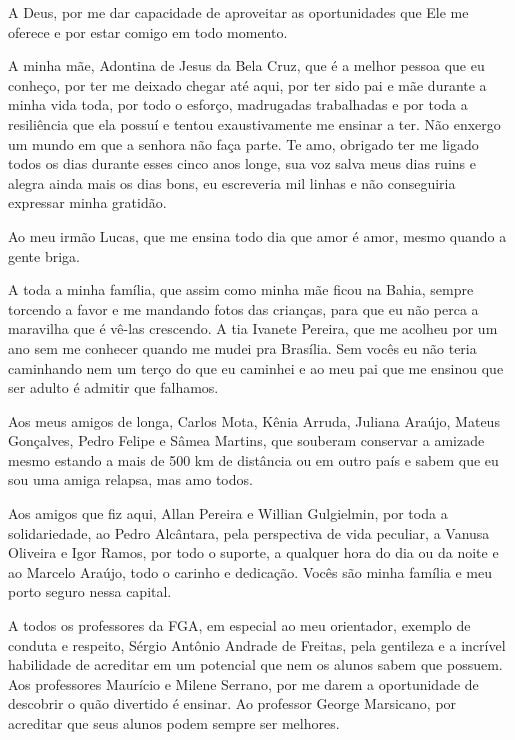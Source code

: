 \begin{agradecimentos}


A Deus, por me dar capacidade de aproveitar as oportunidades que Ele me oferece e por estar comigo em todo momento. 

A minha mãe, Adontina de Jesus da Bela Cruz, que é a melhor pessoa que eu conheço, por ter me deixado chegar até aqui, por ter sido pai e mãe durante a minha vida toda, por todo o esforço, madrugadas trabalhadas e por toda a resiliência que ela possuí e tentou exaustivamente me ensinar a ter. Não enxergo um mundo em que a senhora não faça parte. Te amo, obrigado ter me ligado todos os dias durante esses cinco anos longe, sua voz salva meus dias ruins e alegra ainda mais os dias bons, eu escreveria mil linhas e não conseguiria expressar minha gratidão. 

Ao meu irmão Lucas, que me ensina todo dia que amor é amor, mesmo quando a gente briga.

A toda a minha família, que assim como minha mãe ficou na Bahia, sempre torcendo a favor e me mandando fotos das crianças, para que eu não perca a maravilha que é vê-las crescendo. A tia Ivanete Pereira, que me acolheu por um ano sem me conhecer quando me mudei pra Brasília. Sem vocês eu não teria caminhando nem um terço do que eu caminhei e ao meu pai que me ensinou que ser adulto é admitir que falhamos.

Aos meus amigos de longa, Carlos Mota, Kênia Arruda, Juliana Araújo, Mateus Gonçalves, Pedro Felipe e Sâmea Martins, que souberam conservar a amizade mesmo estando a mais de 500 km de distância ou em outro país e sabem que eu sou uma amiga relapsa, mas amo todos. 

Aos amigos que fiz aqui, Allan Pereira e Willian Gulgielmin, por toda a solidariedade, ao Pedro Alcântara, pela perspectiva de vida peculiar, a Vanusa Oliveira e Igor Ramos, por todo o suporte, a qualquer hora do dia ou da noite e ao Marcelo Araújo, todo o carinho e dedicação. Vocês são minha família e meu porto seguro nessa capital.

A todos os professores da FGA, em especial ao meu orientador, exemplo de conduta e respeito, Sérgio Antônio Andrade de Freitas, pela gentileza e a incrível habilidade de acreditar em um potencial que nem os alunos sabem que possuem. Aos professores Maurício e Milene Serrano, por me darem a oportunidade de descobrir o quão divertido é ensinar. Ao professor George Marsicano, por acreditar que seus alunos podem sempre ser melhores.


\end{agradecimentos}
